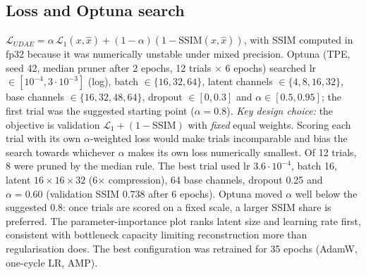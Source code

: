 \documentclass[conference]{IEEEtran}
\begin{document}
\subsection{Loss and Optuna search}
$\mathcal L_{UDAE}=\alpha\,\mathcal L_{1}(x,\hat x)+(1-\alpha)(1-\mathrm{SSIM}(x,\hat x))$, with SSIM computed in fp32 because it was numerically unstable under mixed precision. Optuna (TPE, seed 42, median pruner after 2 epochs, 12 trials $\times$ 6 epochs) searched lr $\in[10^{-4},3\cdot10^{-3}]$ (log), batch $\in\{16,32,64\}$, latent channels $\in\{4,8,16,32\}$, base channels $\in\{16,32,48,64\}$, dropout $\in[0,0.3]$ and $\alpha\in[0.5,0.95]$; the first trial was the suggested starting point ($\alpha=0.8$). \emph{Key design choice:} the objective is validation $\mathcal L_1+(1-\mathrm{SSIM})$ with \emph{fixed} equal weights. Scoring each trial with its own $\alpha$-weighted loss would make trials incomparable and bias the search towards whichever $\alpha$ makes its own loss numerically smallest. Of 12 trials, 8 were pruned by the median rule. The best trial used lr $3.6\cdot10^{-4}$, batch 16, latent $16{\times}16{\times}32$ (6$\times$ compression), 64 base channels, dropout 0.25 and $\alpha=0.60$ (validation SSIM 0.738 after 6 epochs). Optuna moved $\alpha$ well below the suggested 0.8: once trials are scored on a fixed scale, a larger SSIM share is preferred. The parameter-importance plot ranks latent size and learning rate first, consistent with bottleneck capacity limiting reconstruction more than regularisation does. The best configuration was retrained for 35 epochs (AdamW, one-cycle LR, AMP).
\end{document}
